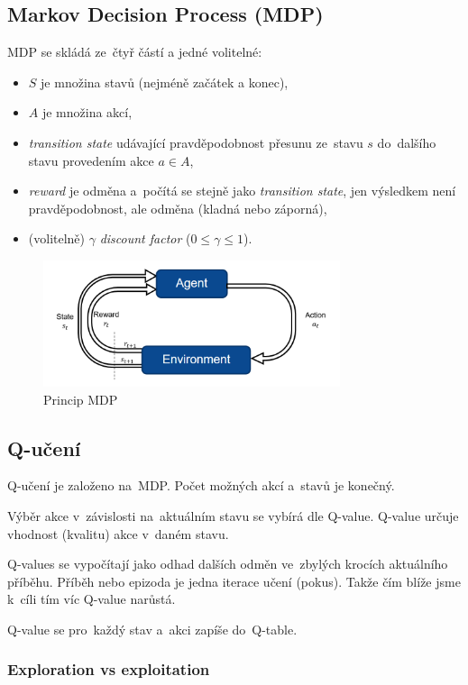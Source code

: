 \subsection{Markov Decision Process (MDP)}

MDP se skládá ze~čtyř částí a jedné volitelné:
\begin{itemize}
	\item $S$ je množina stavů (nejméně začátek a konec),
	\item $A$ je množina akcí,
	\item \emph{transition state} udávající pravděpodobnost přesunu ze~stavu $s$ do~dalšího stavu provedením akce $a \in A$,
	\item \emph{reward} je odměna a~počítá se stejně jako \emph{transition state}, jen výsledkem není pravděpodobnost, ale odměna (kladná nebo záporná),
	\item (volitelně) $\gamma$ \emph{discount factor} ($0 \leq \gamma \leq 1$).
\end{itemize}

\begin{figure}[h]
    \centering
	\includegraphics[height=10em]{images/10_MDP.png}
    \caption{Princip MDP}
    \label{mdp}
\end{figure}

\subsection{Q-učení}

Q-učení je založeno na~MDP.
Počet možných akcí a~stavů je konečný.

Výběr akce v~závislosti na~aktuálním stavu se vybírá dle Q-value.
Q-value určuje vhodnost (kvalitu) akce v~daném stavu.

Q-values se vypočítají jako odhad dalších odměn ve~zbylých krocích aktuálního příběhu.
Příběh nebo epizoda je jedna iterace učení (pokus).
Takže čím blíže jsme k~cíli tím víc Q-value narůstá.

Q-value se pro~každý stav a~akci zapíše do~Q-table.

\subsubsection{Exploration vs exploitation}

